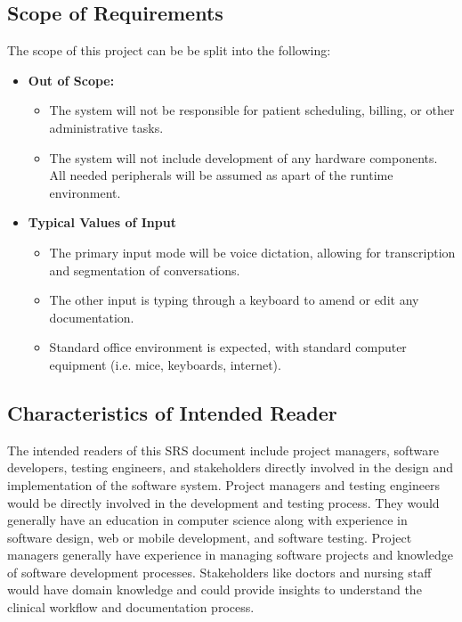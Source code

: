 \documentclass[12pt]{article}
\begin{document}
\subsection{Scope of Requirements} \label{sec_ScopeOfRequirements}

The scope of this project can be be split into the following:

\begin{itemize}
  \item \textbf{Out of Scope:}
  \begin{itemize}
    \item The system will not be responsible for patient scheduling, billing, or other administrative tasks.
    \item The system will not include development of any hardware components. All needed peripherals will be assumed as apart of the runtime environment.
  \end{itemize}
  \item \textbf{Typical Values of Input}
  \begin{itemize}
    \item The primary input mode will be voice dictation, allowing for transcription and segmentation of conversations.
    \item The other input is typing through a keyboard to amend or edit any documentation.
    \item Standard office environment is expected, with standard computer equipment (i.e. mice, keyboards, internet).
  \end{itemize}
\end{itemize}


\subsection{Characteristics of Intended Reader} \label{sec_IntendedReader} 

The intended readers of this SRS document include project managers, software developers, testing engineers, and stakeholders directly involved in the design and implementation of the software system. Project managers and testing engineers would be directly involved in the development and testing process. They would generally have an education in computer science along with experience in software design, web or mobile development, and software testing. Project managers generally have experience in managing software projects and knowledge of software development processes. Stakeholders like doctors and nursing staff would have domain knowledge and could provide insights to understand the clinical workflow and documentation process. 
\end{document}
